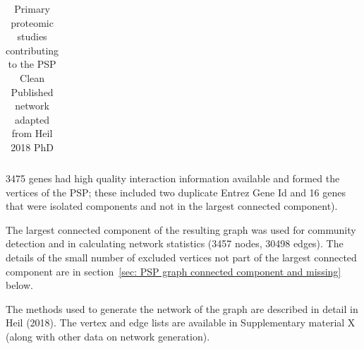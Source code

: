 \begin{table}[]
\begin{tabular}{lllllll}
\bottomrule
    \end{tabular}
    \caption[Primary Proteomic studies contributing to the PSP - from Heil (2018)]{Primary proteomic studies contributing to the PSP Clean Published network adapted from Heil 2018\cite{heil2018systems} PhD 
    }
    \label{tab:Katharina_phd_studies_oksana_studies}
\end{table}







 
3475 genes had high quality interaction information available and formed the vertices of the PSP; these included two duplicate Entrez Gene Id and 16 genes that were isolated components and not in the largest connected component).




 
  




 
 
The largest connected component of the resulting graph was used for community detection and in calculating network statistics (3457 nodes, 30498 edges). The details of the small number of excluded vertices not part of the largest connected component are in section~\ref{sec: PSP graph connected component and missing} below.

The methods used to generate the network of the graph are described in detail in Heil (2018)\cite{heil2018systems}. The vertex and edge lists are available in Supplementary material X (along with other data on network generation).


